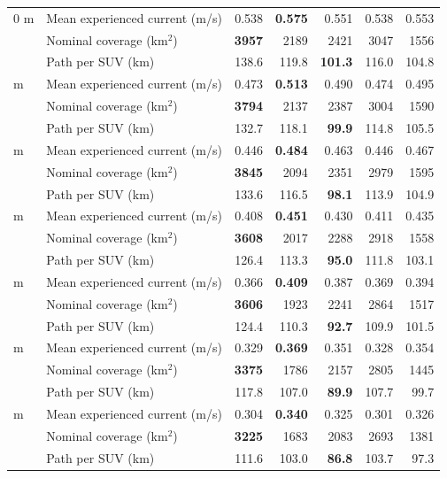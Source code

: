 \documentclass[a4paper,fleqn]{cas-dc}
\begin{document}
\begin{center}
\begin{tabular*}{\textwidth}{@{\extracolsep{\fill}}llrrrrr@{}}
0 m & Mean experienced current (m/s) & 0.538 & \textbf{0.575} & 0.551 & 0.538 & 0.553 \\
 & Nominal coverage (km$^2$) & \textbf{3957} & 2189 & 2421 & 3047 & 1556 \\
 & Path per SUV (km) & 138.6 & 119.8 & \textbf{101.3} & 116.0 & 104.8 \\
\addlinespace[1.5pt]
10 m & Mean experienced current (m/s) & 0.473 & \textbf{0.513} & 0.490 & 0.474 & 0.495 \\
 & Nominal coverage (km$^2$) & \textbf{3794} & 2137 & 2387 & 3004 & 1590 \\
 & Path per SUV (km) & 132.7 & 118.1 & \textbf{99.9} & 114.8 & 105.5 \\
\addlinespace[1.5pt]
20 m & Mean experienced current (m/s) & 0.446 & \textbf{0.484} & 0.463 & 0.446 & 0.467 \\
 & Nominal coverage (km$^2$) & \textbf{3845} & 2094 & 2351 & 2979 & 1595 \\
 & Path per SUV (km) & 133.6 & 116.5 & \textbf{98.1} & 113.9 & 104.9 \\
\addlinespace[1.5pt]
30 m & Mean experienced current (m/s) & 0.408 & \textbf{0.451} & 0.430 & 0.411 & 0.435 \\
 & Nominal coverage (km$^2$) & \textbf{3608} & 2017 & 2288 & 2918 & 1558 \\
 & Path per SUV (km) & 126.4 & 113.3 & \textbf{95.0} & 111.8 & 103.1 \\
\addlinespace[1.5pt]
40 m & Mean experienced current (m/s) & 0.366 & \textbf{0.409} & 0.387 & 0.369 & 0.394 \\
 & Nominal coverage (km$^2$) & \textbf{3606} & 1923 & 2241 & 2864 & 1517 \\
 & Path per SUV (km) & 124.4 & 110.3 & \textbf{92.7} & 109.9 & 101.5 \\
\addlinespace[1.5pt]
50 m & Mean experienced current (m/s) & 0.329 & \textbf{0.369} & 0.351 & 0.328 & 0.354 \\
 & Nominal coverage (km$^2$) & \textbf{3375} & 1786 & 2157 & 2805 & 1445 \\
 & Path per SUV (km) & 117.8 & 107.0 & \textbf{89.9} & 107.7 & 99.7 \\
\addlinespace[1.5pt]
60 m & Mean experienced current (m/s) & 0.304 & \textbf{0.340} & 0.325 & 0.301 & 0.326 \\
 & Nominal coverage (km$^2$) & \textbf{3225} & 1683 & 2083 & 2693 & 1381 \\
 & Path per SUV (km) & 111.6 & 103.0 & \textbf{86.8} & 103.7 & 97.3 \\
\bottomrule
\end{tabular*}
\end{center}
\end{document}
